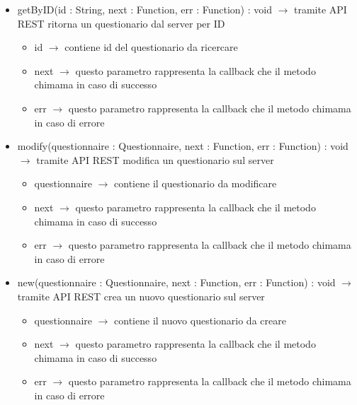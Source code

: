 \begin{description}
\begin{itemize}
	\item getByID(id : String, next : Function, err : Function) : void $\rightarrow$ tramite API REST ritorna un questionario dal server per ID\begin{itemize}
		\item id $\rightarrow$ contiene id del questionario da ricercare
		\item next $\rightarrow$ questo parametro rappresenta la callback che il metodo chimama in caso di successo
		\item err $\rightarrow$ questo parametro rappresenta la callback che il metodo chimama in caso di errore
	\end{itemize}
	
	\item modify(questionnaire : Questionnaire, next : Function, err : Function) : void $\rightarrow$ tramite API REST modifica un questionario sul server\begin{itemize}
		\item questionnaire $\rightarrow$ contiene il questionario da modificare
		\item next $\rightarrow$ questo parametro rappresenta la callback che il metodo chimama in caso di successo
		\item err $\rightarrow$ questo parametro rappresenta la callback che il metodo chimama in caso di errore
	\end{itemize}
	
	\item new(questionnaire : Questionnaire, next : Function, err : Function) : void $\rightarrow$ tramite API REST crea un nuovo questionario sul server\begin{itemize}
		\item questionnaire $\rightarrow$ contiene il nuovo questionario da creare
		\item next $\rightarrow$ questo parametro rappresenta la callback che il metodo chimama in caso di successo
		\item err $\rightarrow$ questo parametro rappresenta la callback che il metodo chimama in caso di errore
	\end{itemize}
	
\end{itemize}

\end{description}

\vspace{0.5cm}
